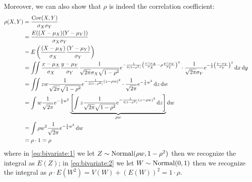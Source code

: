 \documentclass[12pt]{extarticle}
\newcommand{\cov}{{\operatorfont Cov}}
\newcommand{\Normal}{{\operatorfont Normal}}
\begin{document}
Moreover, we can also show that $\rho$ is indeed the correlation coefficient:
\begin{align}
    \rho(X, Y) & = \frac{\cov(X, Y)}{\sigma_X \sigma_Y}                                                                                                                                                                                                                                                                                             \\
               & = \frac{E((X - \mu_X)(Y-\mu_Y))}{\sigma_X \sigma_Y}                                                                                                                                                                                                                                                                                \\
               & = E\left(\frac{(X - \mu_X)}{\sigma_X}\frac{(Y-\mu_Y)}{\sigma_Y}\right)                                                                                                                                                                                                                                                             \\
               & = \iint \frac{x - \mu_X}{\sigma_X} \frac{y - \mu_Y}{\sigma_Y} \frac{1}{\sqrt{2 \pi} \sigma_X \sqrt{1- \rho^2}} e^{-\frac{1}{2(1-\rho^2)} \left( \frac{x - \mu_X}{\sigma_X} - \rho \frac{y-\mu_Y}{\sigma_Y} \right)^2} \cdot \frac{1}{\sqrt{2 \pi} \sigma_Y} e^{-\frac{1}{2} \left(\frac{y-\mu_Y}{\sigma_Y}\right)^2} \dd{x} \dd{y} \\
               & = \iint z w\frac{1}{\sqrt{2 \pi} \sqrt{1- \rho^2}} e^{-\frac{1}{2(1-\rho^2)} \left( z - \rho w \right)^2} \cdot \frac{1}{\sqrt{2 \pi}} e^{-\frac{1}{2} w^2} \dd{z} \dd{w}                                                                                                                                                          \\
               & = \int w \frac{1}{\sqrt{2 \pi}}e^{-\frac{1}{2} w^2} \underbrace{\left[ \int z \frac{1}{\sqrt{2 \pi} \sqrt{1- \rho^2}} e^{-\frac{1}{2(1-\rho^2)} \left( z - \rho w \right)^2} \dd{z} \right]}_{\rho w} \dd{w} \label{eq:bivariate:1}                                                                                                \\
               & = \int \rho w^2 \frac{1}{\sqrt{2 \pi}}e^{-\frac{1}{2} w^2} \dd{w}                                                                                                                                                                                                                                                                  \\
               & = \rho \cdot 1 = \rho \label{eq:bivariate:2}
\end{align}
where in \autoref{eq:bivariate:1} we let $Z \sim \Normal(\rho w, 1-\rho^2)$ then we recognize the integral as $E(Z)$;
in \autoref{eq:bivariate:2} we let $W \sim \Normal(0,1)$ then we recognize the integral as $\rho \cdot E(W^2) = V(W) + \left(E(W)\right)^2 = 1 \cdot \rho$.
\end{document}

